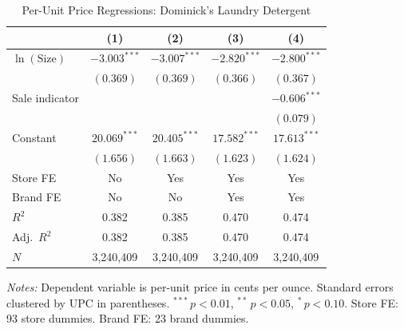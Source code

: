 \begin{table}[htbp]
\centering
\caption{Per-Unit Price Regressions: Dominick's Laundry Detergent}
\label{tab:regression}
\small
\begin{tabular}{lcccc}
\toprule
 & (1) & (2) & (3) & (4) \\
\midrule
$\ln(\text{Size})$ & $-3.003^{***}$ & $-3.007^{***}$ & $-2.820^{***}$ & $-2.800^{***}$ \\
 & $(0.369)$ & $(0.369)$ & $(0.366)$ & $(0.367)$ \\
[4pt]
Sale indicator &  &  &  & $-0.606^{***}$ \\
 &  &  &  & $(0.079)$ \\
[4pt]
Constant & $20.069^{***}$ & $20.405^{***}$ & $17.582^{***}$ & $17.613^{***}$ \\
 & $(1.656)$ & $(1.663)$ & $(1.623)$ & $(1.624)$ \\
\midrule
Store FE & No & Yes & Yes & Yes \\
Brand FE & No & No & Yes & Yes \\
\midrule
$R^2$ & 0.382 & 0.385 & 0.470 & 0.474 \\
Adj.\ $R^2$ & 0.382 & 0.385 & 0.470 & 0.474 \\
$N$ & 3,240,409 & 3,240,409 & 3,240,409 & 3,240,409 \\
\bottomrule
\end{tabular}

\medskip\par\noindent\footnotesize
\textit{Notes:} Dependent variable is per-unit price in cents per ounce. Standard errors clustered by UPC in parentheses. $^{***}\,p<0.01$, $^{**}\,p<0.05$, $^{*}\,p<0.10$. Store FE: 93 store dummies. Brand FE: 23 brand dummies.
\end{table}
